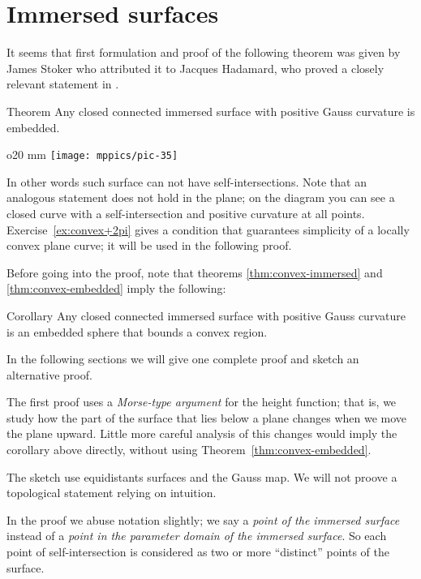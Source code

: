 \section*{Immersed surfaces}

It seems that first formulation and proof of the following theorem was given by James Stoker \cite{stoker} who attributed it to Jacques Hadamard, who proved a closely relevant statement in \cite[item 23]{hadamard}.


\begin{thm}{Theorem}\label{thm:convex-immersed}
Any closed connected immersed surface with positive Gauss curvature is embedded.
\end{thm}

\begin{wrapfigure}{o}{20 mm}
\vskip-0mm
\centering
\texttt{[image: mppics/pic-35]}
\vskip-0mm
\end{wrapfigure}

In other words such surface can not have self-intersections.
Note that an analogous statement does not hold in the plane;
on the diagram you can see a closed curve with a self-intersection and positive curvature at all points.
Exercise~\ref{ex:convex+2pi} gives a condition that guarantees simplicity of a locally convex plane curve;
it will be used in the following proof.



Before going into the proof, note that theorems \ref{thm:convex-immersed} and \ref{thm:convex-embedded}
imply the following:

\begin{thm}{Corollary}
Any closed connected immersed surface with positive Gauss curvature is an embedded sphere that bounds a convex region.
\end{thm}

In the following sections we will give one complete proof and sketch an alternative proof.

The first proof uses a \emph{Morse-type argument} for the height function;
that is, we study how the part of the surface that lies below a plane changes when we move the plane upward.
Little more careful analysis of this changes would imply the corollary above directly, without using Theorem~\ref{thm:convex-embedded}.

The sketch use equidistants surfaces and the Gauss map.
We will not proove a topological statement relying on intuition.

In the proof we abuse notation slightly;
we say a {}\emph{point of the immersed surface} instead of a {}\emph{point in the parameter domain of the immersed surface}.
So each point of self-intersection is considered as two or more ``distinct'' points of the surface.

